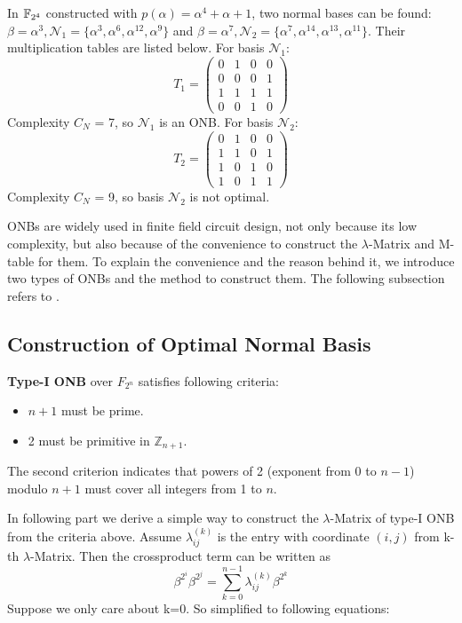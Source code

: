 \begin{Example}
\label{ex:app4}
In ${\mathbb{F}}_{2^4}$ constructed with $p(\alpha) = \alpha^4 + \alpha + 1$, two normal bases can be found:
$\beta = \alpha^3, \mathcal N_1 = \{ \alpha^3, \alpha^6, \alpha^{12}, \alpha^9\}$ and 
$\beta = \alpha^7, \mathcal N_2 = \{\alpha^7, \alpha^{14}, \alpha^{13}, \alpha^{11}\}$. 
Their multiplication tables are listed below. For basis $\mathcal N_1$:
\begin{equation}
T_1 = \left(
\begin{array}{lccr}
0 & 1 & 0 & 0\\
0 & 0 & 0 & 1\\
1 & 1 & 1 & 1\\
0 & 0 & 1 & 0
\end{array} \right)
\end{equation}
Complexity $C_N$ = 7, so $\mathcal N_1$ is an ONB. For basis $\mathcal N_2$:
\begin{equation}
T_2 = \left(
\begin{array}{lccr}
0 & 1 & 0 & 0\\
1 & 1 & 0 & 1\\
1 & 0 & 1 & 0\\
1 & 0 & 1 & 1
\end{array} \right)
\end{equation}
Complexity $C_N$ = 9, so basis $\mathcal N_2$ is not optimal.
\end{Example}

ONBs are widely used in finite field circuit design, not only because its low complexity, 
but also because of the convenience to construct the $\lambda$-Matrix and M-table for them. 
To explain the convenience and the reason behind it, we introduce two types of ONBs and the method 
to construct them.
The following subsection refers to \cite{rosingbook}.
\subsection{Construction of Optimal Normal Basis}
{\bf Type-I ONB} over $F_{2^n}$ satisfies following criteria:
\begin{itemize}
\item $n+1$ must be prime.
\item 2 must be primitive in $\mathbb{Z}_{n+1}$.
\end{itemize}
The second criterion indicates that powers of 2 (exponent from 0 to $n-1$) modulo $n+1$ must cover all integers
from 1 to $n$.

In following part we derive a simple way to construct the $\lambda$-Matrix of type-I ONB 
from the criteria above. 
Assume $\lambda_{ij}^{(k)}$ is the entry with coordinate $(i,j)$ from k-th $\lambda$-Matrix. Then the crossproduct
term can be written as
\begin{equation}
\beta^{2^i}\beta^{2^j} = \sum_{k=0}^{n-1} \lambda_{ij}^{(k)} \beta^{2^k}
\end{equation}
Suppose we only care about k=0. So simplified to following equations:


